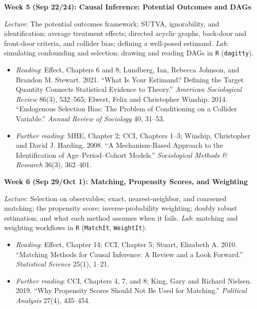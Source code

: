 \documentclass[12pt]{article}
\begin{document}
\vspace{0.8em} \noindent \textbf{\textcolor{titlecolor}{Week 5 (Sep 22/24): Causal Inference: Potential Outcomes and DAGs}}

\noindent \textit{Lecture}: The potential outcomes framework; SUTVA, ignorability, and identification; average treatment effects; directed acyclic graphs, back-door and front-door criteria, and collider bias; defining a well-posed estimand. \textit{Lab}: simulating confounding and selection; drawing and reading DAGs in \texttt{R} (\texttt{dagitty}).
\begin{itemize}[noitemsep, topsep=2pt]
    \item \textit{Reading}: Effect, Chapters 6 and 8; Lundberg, Ian, Rebecca Johnson, and Brandon M. Stewart. 2021. ``What Is Your Estimand? Defining the Target Quantity Connects Statistical Evidence to Theory.'' \textit{American Sociological Review} 86(3), 532--565; Elwert, Felix and Christopher Winship. 2014. ``Endogenous Selection Bias: The Problem of Conditioning on a Collider Variable.'' \textit{Annual Review of Sociology} 40, 31--53.
    \item \textit{Further reading}: MHE, Chapter 2; CCI, Chapters 1--3; Winship, Christopher and David J. Harding. 2008. ``A Mechanism-Based Approach to the Identification of Age--Period--Cohort Models.'' \textit{Sociological Methods \& Research} 36(3), 362--401.
\end{itemize}

\vspace{0.8em} \noindent \textbf{\textcolor{titlecolor}{Week 6 (Sep 29/Oct 1): Matching, Propensity Scores, and Weighting}}

\noindent \textit{Lecture}: Selection on observables; exact, nearest-neighbor, and coarsened matching; the propensity score; inverse-probability weighting; doubly robust estimation; and what each method assumes when it fails. \textit{Lab}: matching and weighting workflows in \texttt{R} (\texttt{MatchIt}, \texttt{WeightIt}).
\begin{itemize}[noitemsep, topsep=2pt]
    \item \textit{Reading}: Effect, Chapter 14; CCI, Chapter 5; Stuart, Elizabeth A. 2010. ``Matching Methods for Causal Inference: A Review and a Look Forward.'' \textit{Statistical Science} 25(1), 1--21.
    \item \textit{Further reading}: CCI, Chapters 4, 7, and 8; King, Gary and Richard Nielsen. 2019. ``Why Propensity Scores Should Not Be Used for Matching.'' \textit{Political Analysis} 27(4), 435--454.
\end{itemize}
\end{document}
